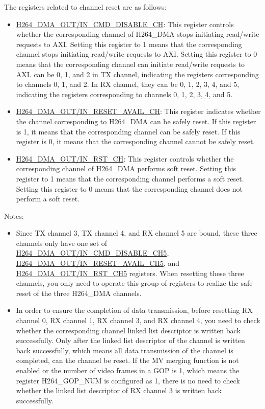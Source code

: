 \documentclass[main\_\_EN.tex]{subfiles}
\begin{document}
The registers related to channel reset are as follows:
\begin{itemize}
    \item \hyperref[fielddesc:H264DMAOUTCMDDISABLECH0]{H264\_DMA\_OUT/IN\_CMD\_DISABLE\_CH}: This register controls whether the corresponding channel of H264\_DMA stops initiating read/write requests to AXI. Setting this register to 1 means that the corresponding channel stops initiating read/write requests to AXI. Setting this register to 0 means that the corresponding channel can initiate read/write requests to AXI.  can be 0, 1, and 2 in TX channel, indicating the registers corresponding to channels 0, 1, and 2. In RX channel, they can be 0, 1, 2, 3, 4, and 5, indicating the registers corresponding to channels 0, 1, 2, 3, 4, and 5.
    \item \hyperref[fielddesc:H264DMAOUTRESETAVAILCH0]{H264\_DMA\_OUT/IN\_RESET\_AVAIL\_CH}: This register indicates whether the channel corresponding to H264\_DMA can be safely reset. If this register is 1, it means that the corresponding channel can be safely reset. If this register is 0, it means that the corresponding channel cannot be safely reset.
    \item \hyperref[fielddesc:H264DMAOUTRSTCH0]{H264\_DMA\_OUT/IN\_RST\_CH}: This register controls whether the corresponding channel of H264\_DMA performs soft reset. Setting this register to 1 means that the corresponding channel performs a soft reset. Setting this register to 0 means that the corresponding channel does not perform a soft reset.
\end{itemize}

Notes:
\begin{itemize}
    \item Since TX channel 3, TX channel 4, and RX channel 5 are bound, these three channels only have one set of \hyperref[fielddesc:H264DMAINCMDDISABLECH5]{H264\_DMA\_OUT/IN\_CMD\_DISABLE\_CH5}, \hyperref[fielddesc:H264DMAINRESETAVAILCH5]{H264\_DMA\_OUT/IN\_RESET\_AVAIL\_CH5}, and \hyperref[fielddesc:H264DMAINRSTCH5]{H264\_DMA\_OUT/IN\_RST\_CH5} registers. When resetting these three channels, you only need to operate this group of registers to realize the safe reset of the three H264\_DMA channels.
    \item In order to ensure the completion of data transmission, before resetting RX channel 0, RX channel 1, RX channel 3, and RX channel 4, you need to check whether the corresponding channel linked list descriptor is written back successfully. Only after the linked list descriptor of the channel is written back successfully, which means all data transmission of the channel is completed, can the channel be reset. If the MV merging function is not enabled or the number of video frames in a GOP is 1, which means the register H264\_GOP\_NUM is configured as 1, there is no need to check whether the linked list descriptor of RX channel 3  is written back successfully.
\end{itemize}
\end{document}
